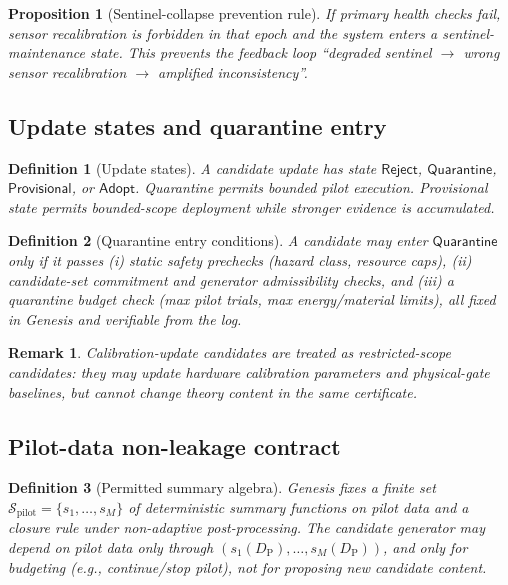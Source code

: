 \documentclass[11pt,a4paper]{article}
\newtheorem{proposition}[theorem]{Proposition}
\newtheorem{definition}{Definition}[section]
\newtheorem{remark}{Remark}[section]
\newcommand{\Rej}{\mathsf{Reject}}
\newcommand{\Quar}{\mathsf{Quarantine}}
\newcommand{\Prov}{\mathsf{Provisional}}
\newcommand{\Adopt}{\mathsf{Adopt}}
\begin{document}
\begin{proposition}[Sentinel-collapse prevention rule]
If primary health checks fail, sensor recalibration is forbidden in that epoch and the system enters a sentinel-maintenance state.
This prevents the feedback loop ``degraded sentinel $\to$ wrong sensor recalibration $\to$ amplified inconsistency''.
\end{proposition}

\subsection{Update states and quarantine entry}
\begin{definition}[Update states]
A candidate update has state $\Rej$, $\Quar$, $\Prov$, or $\Adopt$.
Quarantine permits bounded pilot execution.
Provisional state permits bounded-scope deployment while stronger evidence is accumulated.
\end{definition}

\begin{definition}[Quarantine entry conditions]
A candidate may enter $\Quar$ only if it passes (i) static safety prechecks (hazard class, resource caps), (ii) candidate-set commitment and generator admissibility checks, and (iii) a quarantine budget check (max pilot trials, max energy/material limits), all fixed in Genesis and verifiable from the log.
\end{definition}

\begin{remark}
Calibration-update candidates are treated as restricted-scope candidates: they may update hardware calibration parameters and physical-gate baselines, but cannot change theory content in the same certificate.
\end{remark}

\subsection{Pilot-data non-leakage contract}
\begin{definition}[Permitted summary algebra]
Genesis fixes a finite set $\mathcal{S}_{\mathrm{pilot}}=\{s_1,\dots,s_M\}$ of deterministic summary functions on pilot data and a closure rule under \emph{non-adaptive} post-processing.
The candidate generator may depend on pilot data only through $(s_1(D_{\mathrm{P}}),\dots,s_M(D_{\mathrm{P}}))$, and only for budgeting (e.g., continue/stop pilot), not for proposing new candidate content.
\end{definition}
\end{document}

